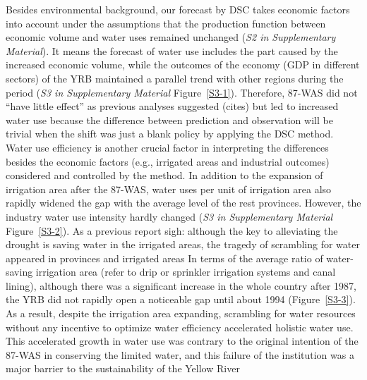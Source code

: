 \label{result-1-p2}
Besides environmental background, our forecast by DSC takes economic factors into account under the assumptions that the production function between economic volume and water uses remained unchanged (\textit{S2 in Supplementary Material}).
It means the forecast of water use includes the part caused by the increased economic volume, while the outcomes of the economy (GDP in different sectors) of the YRB maintained a parallel trend with other regions during the period (\textit{S3 in Supplementary Material} Figure~\ref{S3-1}).
Therefore, 87-WAS did not ``have little effect'' as previous analyses suggested (cites) but led to increased water use because the difference between prediction and observation will be trivial when the shift was just a blank policy by applying the DSC method. %
Water use efficiency is another crucial factor in interpreting the differences besides the economic factors (e.g., irrigated areas and industrial outcomes) considered and controlled by the method.
In addition to the expansion of irrigation area after the 87-WAS, water uses per unit of irrigation area also rapidly widened the gap with the average level of the rest provinces. However, the industry water use intensity hardly changed (\textit{S3 in Supplementary Material} Figure~\ref{S3-2}).
As a previous report sigh: although the key to alleviating the drought is saving water in the irrigated areas, the tragedy of scrambling for water appeared in provinces and irrigated areas %
In terms of the average ratio of water-saving irrigation area (refer to drip or sprinkler irrigation systems and canal lining), although there was a significant increase in the whole country after 1987, the YRB did not rapidly open a noticeable gap until about 1994 (Figure~\ref{S3-3}).
As a result, despite the irrigation area expanding, scrambling for water resources without any incentive to optimize water efficiency accelerated holistic water use.
This accelerated growth in water use was contrary to the original intention of the 87-WAS in conserving the limited water, and this failure of the institution was a major barrier to the sustainability of the Yellow River %


